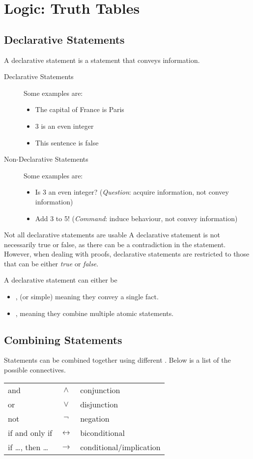 \documentclass[../notes.tex]{subfiles}
\begin{document}
	\ifSubfilesClassLoaded{\setcounter{chapter}{8}}{}
	\chapter{Logic: Truth Tables}
		\section{Declarative Statements}
			A declarative statement is a statement that conveys information.
			\begin{description}
				\item[Declarative Statements] Some examples are:
					\begin{itemize}[nosep]
						\item The capital of France is Paris
						\item 3 is an even integer
						\item This sentence is false
					\end{itemize}
				\item[Non-Declarative Statements] Some examples are:
					\begin{itemize}[nosep]
						\item Is 3 an even integer? (\emph{Question}: acquire information, not convey information)
						\item Add 3 to 5! (\emph{Command}: induce behaviour, not convey information)
					\end{itemize}
			\end{description}
			\begin{sidenote}{Not all declarative statements are usable}
				A declarative statement is not necessarily true or false, as there can be a contradiction in the statement.\\
				However, when dealing with proofs, declarative statements are restricted to those that can be either \emph{true} or \emph{false}.
			\end{sidenote}
			A declarative statement can either be
			\begin{itemize}[nosep]
				\item {}, (or simple) meaning they convey a single fact.
				\item {}, meaning they combine multiple atomic statements.
			\end{itemize}
		\section{Combining Statements}
			Statements can be combined together using different . Below is a list of the possible connectives.
			\begin{center}
				\begin{tabular}{l c l}
					and & $\land$ & conjunction\\
					or & $\lor$ & disjunction\\
					not & $\lnot $ & negation\\
					if and only if & $\leftrightarrow$ & biconditional\\
					if \ldots, then \ldots & $\rightarrow$ & conditional/implication
				\end{tabular}
			\end{center}
\end{document}
